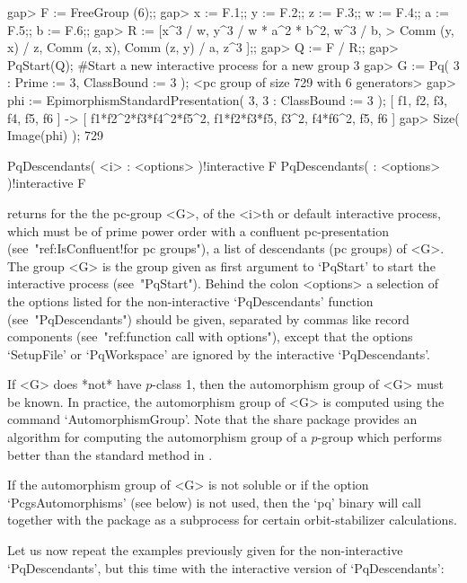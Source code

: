 \beginexample
gap> F := FreeGroup (6);;
gap> x := F.1;; y := F.2;; z := F.3;; w := F.4;; a := F.5;; b := F.6;;
gap> R := [x^3 / w, y^3 / w * a^2 * b^2, w^3 / b,
>          Comm (y, x) / z, Comm (z, x), Comm (z, y) / a, z^3 ];;
gap> Q := F / R;;
gap> PqStart(Q); #Start a new interactive process for a new group       
3
gap> G := Pq( 3 : Prime := 3, ClassBound := 3 );
<pc group of size 729 with 6 generators>
gap> phi := EpimorphismStandardPresentation( 3, 3 : ClassBound := 3 );
[ f1, f2, f3, f4, f5, f6 ] -> [ f1*f2^2*f3*f4^2*f5^2, f1*f2*f3*f5, f3^2, 
  f4*f6^2, f5, f6 ]
gap> Size( Image(phi) );
729
\endexample

\>PqDescendants( <i> : <options> )!{interactive} F
\>PqDescendants( : <options> )!{interactive} F

returns for the the pc-group <G>, of the  <i>th  or  default  interactive
{\ANUPQ} process, which must be of prime power  order  with  a  confluent
pc-presentation  (see~"ref:IsConfluent!for  pc  groups"),   a   list   of
descendants (pc groups) of <G>. The group <G> is the group given as first
argument  to  `PqStart'  to  start  the  interactive   {\ANUPQ}   process
(see~"PqStart"). Behind the colon <options> a selection  of  the  options
listed    for    the     non-interactive     `PqDescendants'     function
(see~"PqDescendants") should be given, separated by  commas  like  record
components  (see~"ref:function  call  with  options"),  except  that  the
options `SetupFile' or  `PqWorkspace'  are  ignored  by  the  interactive
`PqDescendants'.

If <G> does *not* have $p$-class 1, then the automorphism  group  of  <G>
must be known. In practice, the automorphism group  of  <G>  is  computed
using the {\GAP} command `AutomorphismGroup'. Note that the {\GAP}  share
package {\AutPGrp} provides an algorithm for computing  the  automorphism
group of a $p$-group which performs better than the  standard  method  in
{\GAP}.

If the automorphism group  of  <G>  is  not  soluble  or  if  the  option
`PcgsAutomorphisms' (see below) is not used, then the  `pq'  binary  will
call {\GAP} together with the {\AutPGrp}  package  as  a  subprocess  for
certain orbit-stabilizer calculations.

Let us now repeat the examples previously given for  the  non-interactive
`PqDescendants',  but  this  time  with  the   interactive   version   of
`PqDescendants':


